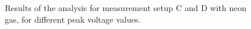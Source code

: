\begin{figure}
 \hfill
 \caption{Results of the analysis for measurement setup C and D with neon gas, for different peak voltage values.}
 \label{fig:neon_ab_xb}
\end{figure}


